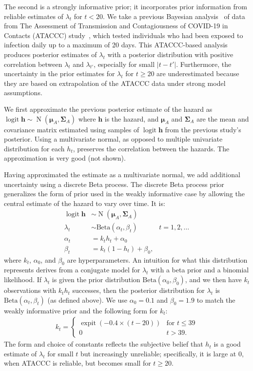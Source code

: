 \documentclass{article}
\def\dist{\sim}
\DeclareMathOperator{\logit}{logit}
\DeclareMathOperator{\MNorm}{N}
\DeclareMathOperator{\expit}{expit}
\newcommand\matr{\bm}
\renewcommand{\vec}[1]{\bm{#1}}
\begin{document}
The second is a strongly informative prior; it incorporates prior information from reliable estimates of $\lambda_t$ for $t < 20$.
We take a previous Bayesian analysis~\citep{blakeThesis} of data from The Assessment of Transmission and Contagiousness of COVID-19 in Contacts (ATACCC) study~\citep{hakkiOnset}, which tested individuals who had been exposed to infection daily up to a maximum of 20 days.
This ATACCC-based analysis produces posterior estimates of $\lambda_t$ with a posterior distribution with positive correlation between $\lambda_t$ and $\lambda_{t'}$, especially for small $|t-t'|$.
Furthermore, the uncertainty in the prior estimates for $\lambda_t$ for $t\geq20$ are underestimated because they are based on extrapolation of the ATACCC data under strong model assumptions.

We first approximate the previous posterior estimate of the hazard as $\logit{\vec{h}} \dist \MNorm(\vec{\mu}_A, \matr{\Sigma}_A)$ where $\vec{h}$ is the hazard, and $\vec{\mu}_A$ and $\matr{\Sigma}_A$ are the mean and covariance matrix estimated using samples of $\logit{\vec{h}}$ from the previous study's posterior.
Using a multivariate normal, as opposed to multiple univariate distribution for each $h_t$, preserves the correlation between the hazards.
The approximation is very good (not shown).

Having approximated the estimate as a multivariate normal, we add additional uncertainty using a discrete Beta process.
The discrete Beta process prior~\citep{ibrahimBayesian,sunStatisticala} generalizes the form of prior used in the weakly informative case by allowing the central estimate of the hazard to vary over time.
It is:
\begin{align}
  \logit \vec{h} &\dist \MNorm(\vec{\mu}_A, \matr{\Sigma}_A) \\
  \lambda_t &\dist \text{Beta}(\alpha_t, \beta_t) &t = 1, 2, \dots \\
  \alpha_t &= k_t h_t + \alpha_0 \\
  \beta_t &= k_t (1 - h_t) + \beta_0,
\end{align}
where $k_t$, $\alpha_0$, and $\beta_0$ are hyperparameters.
An intuition for what this distribution represents derives from a conjugate model for $\lambda_t$ with a beta prior and a binomial likelihood.
If $\lambda_t$ is given the prior distribution $\text{Beta}(\alpha_0, \beta_0)$, and we then have $k_t$ observations with $k_t h_t$ successes, then the posterior distribution for $\lambda_t$ is $\text{Beta}(\alpha_t, \beta_t)$ (as defined above).
We use $\alpha_0 = 0.1$ and $\beta_0 = 1.9$ to match the weakly informative prior and the following form for $k_t$:
\begin{align}
k_t = \begin{cases}
  \expit(-0.4 \times (t - 20)) &\text{for $t \leq 39$} \\
  0 &t > 39.
\end{cases}
\end{align}
The form and choice of constants reflects the subjective belief that $h_t$ is a good estimate of $\lambda_t$ for small $t$ but increasingly unreliable; specifically, it is large at 0, when ATACCC is reliable, but becomes small for $t \geq 20$.
\end{document}
